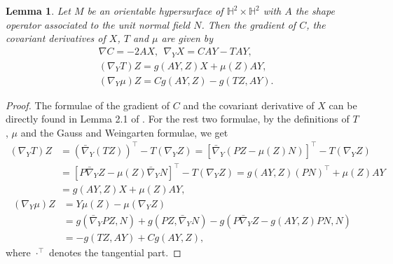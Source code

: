 \documentclass[reqno]{amsart}%
\newtheorem{lemma}[theorem]{Lemma}
\theoremstyle{definition}
\newtheorem{remark}{Remark}[section]
\numberwithin{equation}{section}
\begin{document}
\begin{lemma}\label{lemma:2.1}
Let $M$ be an orientable hypersurface of $\mathbb{H}^2\times\mathbb{H}^2$
with $A$ the shape operator associated
to the unit normal field $N$. Then the gradient of $C$, the
covariant derivatives of $X$, $T$ and $\mu$ are given by
%
\begin{equation}\label{eqn:2.4}
\begin{split}
&\nabla C=-2 AX,\ \ \nabla_{Y}X=C AY -T A Y,\\
&\left(\nabla_Y T\right) Z =g( AY,Z)X+\mu(Z) A Y,\\
&\left(\nabla_Y \mu\right) Z=C g( AY,Z)-g( TZ,AY).
\end{split}
\end{equation}
\end{lemma}
%
\begin{proof}
The formulae of the gradient of $C$ and the covariant derivative of $X$ can be directly found
in Lemma 2.1 of \cite{GMY}. For the rest two formulae, by the definitions of $T$, $\mu$
and the Gauss and Weingarten formulae, we get
%
\begin{align*}
\left(\nabla_{Y} T\right) Z &=(\bar{\nabla}_{Y} (T Z))^{\top}-T (\nabla_{Y} Z) 
=[\bar{\nabla}_{Y}(P Z-\mu(Z) N)]^{\top}-T (\nabla_{Y} Z) \\
&=[P \bar{\nabla}_{Y} Z-\mu(Z) \bar{\nabla}_{Y} N]^{\top}-T (\nabla_{Y} Z) 
=g(AY,Z)(P N)^{\top}+\mu(Z) A Y\\
&=g(AY,Z)X+\mu(Z) A Y,
\end{align*}
%
\begin{align*}
\left(\nabla_{Y} \mu\right) Z&= Y \mu(Z)-\mu\left(\nabla_{Y} Z\right) \\
&=g(\bar{\nabla}_{Y} PZ,N)+g(PZ,\bar{\nabla}_{Y} N)-g(P\bar{\nabla}_{Y} Z-g(AY,Z) PN,N)\\
&=-g(TZ,AY)+Cg(AY,Z),
\end{align*}
%
where $\cdot^\top$ denotes the tangential part.
\end{proof}

\end{document}
